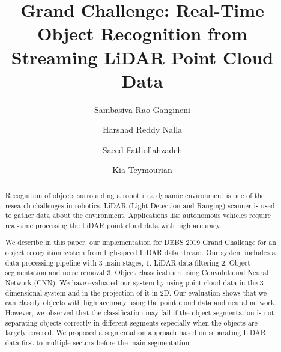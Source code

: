 \documentclass[sigconf]{acmart}
\begin{document}
%

\title{Grand Challenge: Real-Time Object Recognition from Streaming LiDAR Point Cloud Data}


%


\author{Sambasiva Rao Gangineni}

\author{Harshad Reddy Nalla}


\author{Saeed Fathollahzadeh}

\author{Kia Teymourian}



%
\renewcommand{\shortauthors}{Gangineni, et al.}

%
\begin{abstract}
Recognition of objects surrounding a robot in a dynamic environment is one of the research challenges in robotics.
LiDAR (Light Detection and Ranging) scanner is used to gather data about the environment.
Applications like autonomous vehicles require real-time processing the LiDAR point cloud data with high accuracy.

We describe in this paper, our implementation for DEBS 2019 Grand Challenge for an object recognition system from high-speed
LiDAR data stream. Our system includes a data processing pipeline with 3 main stages, 1. LiDAR data filtering 2. Object segmentation and noise removal 3. Object classifications using Convolutional Neural Network (CNN). We have evaluated our system by using point cloud data in the 3-dimensional system and in the projection of it in 2D. Our evaluation shows that we can classify objects with high accuracy using the point cloud data and neural network. However, we observed that the classification may fail if the object segmentation is not separating objects correctly in different segments especially when the objects are largely covered. We proposed a segmentation approach based on separating LiDAR data first to multiple sectors before the main segmentation.
\end{abstract}
\end{document}
